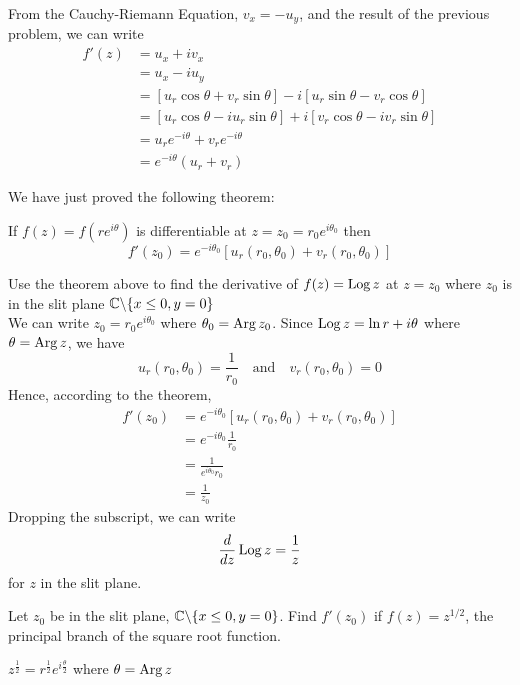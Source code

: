 \documentclass[handout]{ximera}
\begin{document}
From the Cauchy-Riemann Equation, $v_x = -u_y$, and the result of the previous problem, we can write
\begin{align*}
f'(z) &= u_x + iv_x\\
      & = u_x - iu_y\\
      &= \left[u_r \cos \theta + v_r \sin \theta\right] - i\left[ u_r \sin \theta - v_r \cos \theta \right]\\
      &= \left[u_r \cos \theta -i u_r \sin \theta\right] + i\left[ v_r \cos \theta  - iv_r \sin \theta\right]\\
      &= u_r e^{-i\theta} + v_r e^{-i\theta}\\
      &=  e^{-i\theta}(u_r +v_r)
\end{align*}

We have just proved the following theorem:

\begin{theorem}
If $f(z) = f\left(re^{i\theta}\right)$ is differentiable at $z = z_0 = r_0 e^{i\theta_0}$ then
\[
f'(z_0) = e^{-i\theta_0} \left[u_r(r_0, \theta_0) + v_r(r_0, \theta_0)\right]
\]
\end{theorem}

\begin{example}
Use the theorem above to find the derivative of $f(z) = \operatorname{Log} z$ at $z = z_0$ where $z_0$ is in the 
slit plane $\mathbb C \backslash \{x\leq 0, y=0\}$ \\
We can write $z_0 = r_0 e^{i\theta_0}$ where $\theta_0 = \operatorname{Arg} z_0$. Since $\operatorname{Log} z = \ln r + i\theta$
where $\theta = \operatorname{Arg} z$, we have 
\[
u_r(r_0,\theta_0) = \frac{1}{r_0} \quad \mbox{and} \quad v_r(r_0,\theta_0) = 0
\]
Hence, according to the theorem,
\begin{align*}
f'(z_0) &= e^{-i\theta_0}[u_r(r_0,\theta_0)+v_r(r_0,\theta_0)] \\
        &= e^{-i\theta_0}\frac{1}{r_0}\\
        &= \frac{1}{e^{i\theta_0}r_0}\\
        &= \frac{1}{z_0}
\end{align*}
Dropping the subscript, we can write
\[
\frac{d}{dz} \operatorname{Log} z = \frac{1}{z}
\]
for $z$ in the slit plane.
\end{example}

\begin{problem} Let $z_0$ be in the slit plane, $\mathbb C \backslash \{x\leq 0, y=0\}$. 
Find $f'(z_0)$ if $f(z) = z^{1/2}$, the principal branch of the square root function.
\begin{hint}
$\displaystyle z^{\frac12} = r^{\frac12}e^{i\frac{\theta}{2}}$ where $\theta = \operatorname{Arg} z$
\end{hint}
\end{problem}
\end{document}
